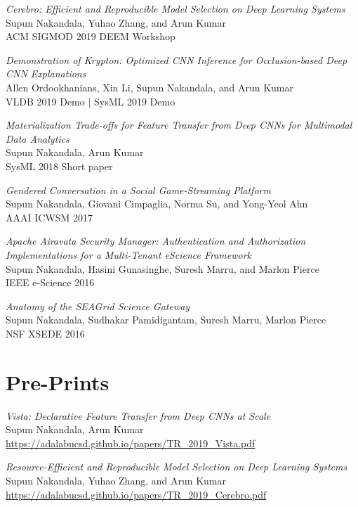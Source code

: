 \documentclass[margin]{res}
\begin{document}
\begin{resume}
\par
\textit{Cerebro: Efficient and Reproducible Model Selection on Deep Learning Systems} \\
Supun Nakandala, Yuhao Zhang, and Arun Kumar\\
ACM SIGMOD 2019 DEEM Workshop

\par
\textit{Demonstration of Krypton: Optimized CNN Inference for Occlusion-based Deep CNN Explanations} \\
Allen Ordookhanians, Xin Li, Supun Nakandala, and Arun Kumar\\
VLDB 2019 Demo $|$ SysML 2019 Demo

\par
\textit{Materialization Trade-offs for Feature Transfer from Deep CNNs for Multimodal Data Analytics} \\
Supun Nakandala, Arun Kumar\\
SysML 2018 Short paper

\par
\textit{Gendered Conversation in a Social Game-Streaming Platform} \\
Supun Nakandala, Giovani Cimpaglia, Norma Su, and Yong-Yeol Ahn \\
AAAI ICWSM 2017

\par
\textit{Apache Airavata Security Manager: Authentication and Authorization Implementations for a Multi-Tenant eScience Framework
} \\
Supun Nakandala, Hasini Gunasinghe, Suresh Marru, and Marlon Pierce\\
IEEE e-Science 2016

\par
\textit{Anatomy of the SEAGrid Science Gateway} \\
Supun Nakandala, Sudhakar Pamidigantam, Suresh Marru, Marlon Pierce\\
NSF XSEDE 2016


\vspace{10mm}
\section{Pre-Prints}
\par
\textit{Vista: Declarative Feature Transfer from Deep CNNs at Scale} \\
Supun Nakandala, Arun Kumar\\
\url{https://adalabucsd.github.io/papers/TR_2019_Vista.pdf}

\par
\textit{Resource-Efficient and Reproducible Model Selection on Deep Learning Systems} \\
Supun Nakandala, Yuhao Zhang, and Arun Kumar\\
\url{https://adalabucsd.github.io/papers/TR_2019_Cerebro.pdf}



\end{resume}
\end{document}

